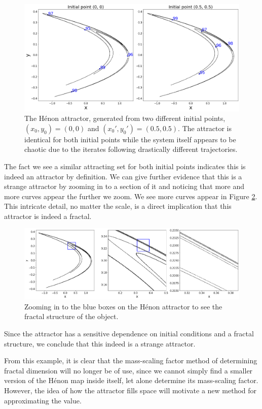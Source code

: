 \begin{exmp}
    \begin{figure}
        \centering
        \includegraphics[width=0.75\linewidth]{Images/Henon attractor with labels.png}
        \caption{The Hénon attractor, generated from two different initial points, $(x_0,y_0) = (0,0)$ and $(x_0',y_0') = (0.5,0.5)$. The attractor is identical for both initial points while the system itself appears to be chaotic due to the iterates following drastically different trajectories.}
        \label{fig:Henon2}
    \end{figure}
    The fact we see a similar attracting set for both initial points indicates this is indeed an attractor by definition. We can give further evidence that this is a strange attractor by zooming in to a section of it and noticing that more and more curves appear the further we zoom. We see more curves appear in Figure \ref{fig:Henon3}. This intricate detail, no matter the scale, is a direct implication that this attractor is indeed a fractal.
    \begin{figure}
        \centering
        \includegraphics[width=1\linewidth]{Images/henon zoom.png}
        \caption{Zooming in to the blue boxes on the Hénon attractor to see the fractal structure of the object.}
        \label{fig:Henon3}
    \end{figure}
    Since the attractor has a sensitive dependence on initial conditions and a fractal structure, we conclude that this indeed is a strange attractor.
\end{exmp}
From this example, it is clear that the mass-scaling factor method of determining fractal dimension will no longer be of use, since we cannot simply find a smaller version of the Hénon map inside itself, let alone determine its mass-scaling factor. However, the idea of how the attractor fills space will motivate a new method for approximating the value.\\

